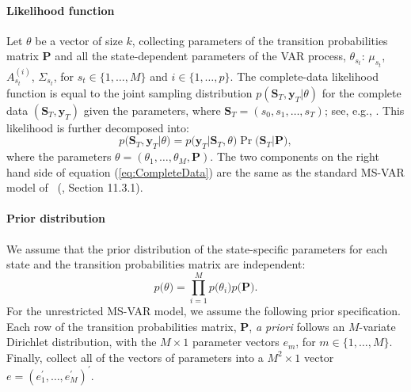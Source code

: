 \documentclass[final,3p,authoryear]{elsarticle}
\begin{document}
\paragraph{Likelihood function} Let $\theta$ be a vector of size $k$, collecting parameters of the transition probabilities matrix $\mathbf{P}$ and all the state-dependent parameters of the VAR process, $\theta_{s_t}$: $\mu_{s_t}$, $A_{s_t}^{(i)}$, $\Sigma_{s_t}$, for $s_t \in\{ 1,\dots,M\}$ and $i \in\{ 1,\dots,p\}$. The complete-data likelihood function is equal to the joint sampling distribution $p(\mathbf{S}_T ,\mathbf{y}_T |\theta)$ for the complete data $(\mathbf{S}_T ,\mathbf{y}_T )$ given the parameters, where $\mathbf{S}_T = (s_0, s_1, \dots, s_T)$; see, e.g., \cite{Fruhwirth-Schnatter2006}. This likelihood is further decomposed into: 
\begin{equation}\label{eq:CompleteData}
  p\bigl( \mathbf{S}_T , \mathbf{y}_T \big|\theta \bigr) = p\bigl( \mathbf{y}_T \big| \mathbf{S}_T ,\theta \bigr) \Pr\bigl( \mathbf{S}_T \big| \mathbf{P} \bigr),
\end{equation}
where the parameters $\theta = (\theta_1 , \ldots , \theta_M , \mathbf{P})$. The two components on the right hand side of equation (\ref{eq:CompleteData}) are the same as the standard MS-VAR model of \citeauthor{Fruhwirth-Schnatter2006}~(\citeyear{Fruhwirth-Schnatter2006}, Section 11.3.1).












\paragraph{Prior distribution}
We assume that the prior distribution of the state-specific parameters for each state and the transition probabilities matrix are independent:
\begin{equation}\label{eq:prior1}
     p\bigl(\theta \bigr) = \prod_{i=1}^{M} p\bigl(\theta_i\bigr)p\bigl(\mathbf{P}\bigr).
\end{equation} 
For the unrestricted MS-VAR model, we assume the following prior specification. Each row of the transition probabilities matrix, $\mathbf{P}$, \emph{a priori} follows an $M$-variate Dirichlet distribution, with the $M\times1$ parameter vectors $e_m$, for $m\in\{1,\dots,M\}$. Finally, collect all of the vectors of parameters into a $M^2\times1$ vector $e=(e_1^{'},\dots,e_M^{'})^{'}$.
\end{document}
